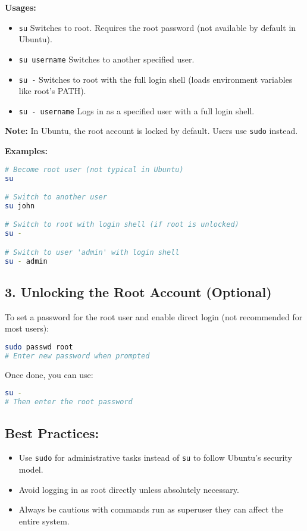 \documentclass[12pt]{article}
\begin{document}
\textbf{Usages:}
\begin{itemize}
    \item \texttt{su} \textendash{} Switches to root. Requires the root password (not available by default in Ubuntu).
    \item \texttt{su username} \textendash{} Switches to another specified user.
    \item \texttt{su -} \textendash{} Switches to root with the full login shell (loads environment variables like root's PATH).
    \item \texttt{su - username} \textendash{} Logs in as a specified user with a full login shell.
\end{itemize}

\textbf{Note:} In Ubuntu, the root account is locked by default. Users use \texttt{sudo} instead.

\textbf{Examples:}
\begin{lstlisting}[language=bash]
# Become root user (not typical in Ubuntu)
su

# Switch to another user
su john

# Switch to root with login shell (if root is unlocked)
su -

# Switch to user 'admin' with login shell
su - admin
\end{lstlisting}

\subsection*{3. Unlocking the Root Account (Optional)}
To set a password for the root user and enable direct login (not recommended for most users):

\begin{lstlisting}[language=bash]
sudo passwd root
# Enter new password when prompted
\end{lstlisting}

Once done, you can use:
\begin{lstlisting}[language=bash]
su -
# Then enter the root password
\end{lstlisting}

\subsection*{Best Practices:}
\begin{itemize}
    \item Use \texttt{sudo} for administrative tasks instead of \texttt{su} to follow Ubuntu's security model.
    \item Avoid logging in as root directly unless absolutely necessary.
    \item Always be cautious with commands run as superuser \textendash{} they can affect the entire system.
\end{itemize}
\end{document}
